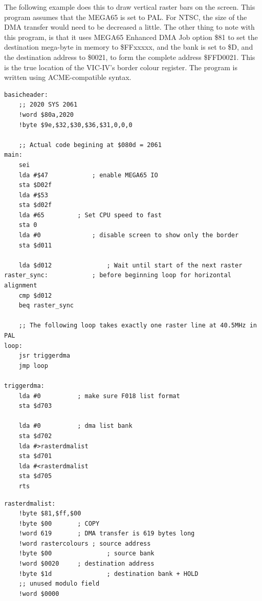 The following example does this to draw vertical raster bars on the screen.
This program assumes that the MEGA65 is set to PAL.  For NTSC, the size of the DMA transfer
would need to be decreased a little.  The other thing to note with this program, is that
it uses MEGA65 Enhanced DMA Job option \$81 to set the destination mega-byte in memory to
\$FFxxxxx, and the bank is set to \$D, and the destination address to \$0021, to form the
complete address \$FFD0021.  This is the true location of the VIC-IV's border colour register.
The program is written using ACME-compatible syntax.

\begin{tcolorbox}[colback=black,coltext=white]
\verbatimfont{\codefont}
\begin{verbatim}
basicheader:
	;; 2020 SYS 2061
	!word $80a,2020
	!byte $9e,$32,$30,$36,$31,0,0,0

	;; Actual code begining at $080d = 2061
main:
	sei
	lda #$47        	; enable MEGA65 IO
	sta $D02f
	lda #$53
	sta $d02f
	lda #65 		; Set CPU speed to fast
	sta 0
	lda #0            	; disable screen to show only the border
	sta $d011

	lda $d012              	; Wait until start of the next raster
raster_sync:	  		; before beginning loop for horizontal alignment
	cmp $d012
	beq raster_sync

	;; The following loop takes exactly one raster line at 40.5MHz in PAL
loop:
	jsr triggerdma
	jmp loop

triggerdma:
	lda #0			; make sure F018 list format
	sta $d703

	lda #0     		; dma list bank
	sta $d702
	lda #>rasterdmalist
	sta $d701
	lda #<rasterdmalist
	sta $d705
	rts
\end{verbatim}
\end{tcolorbox}

\begin{tcolorbox}[colback=black,coltext=white]
\verbatimfont{\codefont}
\begin{verbatim}
rasterdmalist:
	!byte $81,$ff,$00
	!byte $00 		; COPY
	!word 619 		; DMA transfer is 619 bytes long
	!word rastercolours	; source address
	!byte $00               ; source bank
	!word $0020		; destination address
	!byte $1d               ; destination bank + HOLD
	;; unused modulo field
	!word $0000
\end{verbatim}
\end{tcolorbox}

